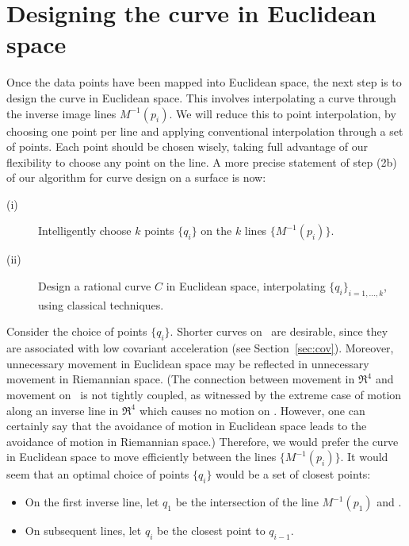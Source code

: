 
\section{Designing the curve in Euclidean space}
\label{sec:eucdesign}

Once the data points have been mapped into Euclidean space,
the next step is to design the curve in Euclidean space.
This involves interpolating a curve through the 
inverse image lines $M^{-1}(p_i)$.
We will reduce this to point interpolation, 
by choosing one point per line
and applying conventional interpolation through a set of points.
Each point should be chosen wisely, taking full advantage of our
flexibility to choose any point on the line.
A more precise statement of step (2b) of our algorithm
for curve design on a surface is now:
%
\begin{description}
\item[(i)] 
	Intelligently choose $k$ points
	$\{q_i\}$ on the $k$ lines $\{M^{-1}(p_i)\}$.
\item[(ii)]
	Design a rational curve $C$ in Euclidean space,
	interpolating $\{q_i\}_{i=1,\ldots,k}$, using classical techniques.
\end{description}

Consider the choice of points $\{q_i\}$.
Shorter curves on \ are
desirable, since they are associated with low covariant
acceleration (see Section~\ref{sec:cov}).
Moreover, unnecessary movement in Euclidean space
may be reflected in unnecessary movement in Riemannian space.
(The connection between movement in $\Re^4$ and movement on \ 
is not tightly coupled, as witnessed by the extreme case of motion along
an inverse line in $\Re^4$ which causes no motion on \Sn{3}.
However, one can certainly
say that the avoidance of motion in Euclidean space leads to the avoidance
of motion in Riemannian space.)
Therefore, we would prefer the curve in Euclidean space to move
efficiently between the lines $\{M^{-1}(p_i)\}$.
It would seem that an optimal choice of points	
$\{q_i\}$ would be a set of closest points:
	
\begin{itemize}
\item On the first inverse line, let $q_1$ be the intersection
of the line $M^{-1}(p_1)$ and .
\item On subsequent lines, let $q_i$ be the closest point to $q_{i-1}$.
\end{itemize}

